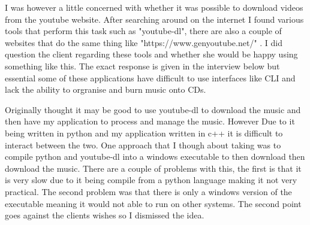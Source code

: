 \documentclass{article}
\begin{document}
I was however a little concerned with whether it was possible to download
videos from the youtube website. After searching around on the internet
I found various tools that perform this task such as "youtube-dl", there
are also a couple of websites that do the same thing like "https://www.genyoutube.net/"
. I did question the client regarding these tools and whether she would
be happy using something like this. The exact response is given in the interview
below but essential some of these applications have difficult to use interfaces
like CLI and lack the ability to orgranise and burn music onto CDs.

Originally thought it may be good to use youtube-dl to download the music
and then have my application to process and manage the music. However Due to it being written in python
and my application written in c++
it is difficult to interact between the two. One approach that I though about taking was to compile
python and youtube-dl into a windows executable to then download then download the music. There are a couple of problems with this, the
first is that it is very slow due to it being compile from a python language making it not very practical.
The second problem was that there is only a windows version of the executable meaning it would not
able to run on other systems. The second point goes against the clients wishes so
I dismissed the idea.
\end{document}
